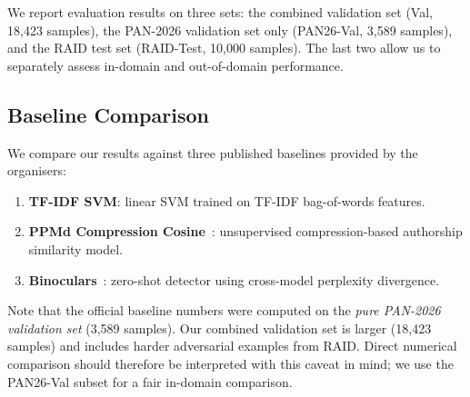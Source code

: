 We report evaluation results on three sets: the combined validation set (Val, 18,423 samples),
the PAN-2026 validation set only (PAN26-Val, 3,589 samples), and the RAID test set (RAID-Test,
10,000 samples). The last two allow us to separately assess in-domain and out-of-domain performance.

\subsection{Baseline Comparison}

We compare our results against three published baselines provided by the organisers:

\begin{enumerate}
  \item \textbf{TF-IDF SVM}: linear SVM trained on TF-IDF bag-of-words features.
  \item \textbf{PPMd Compression Cosine}~\cite{sculley:2006,halvani:2017}: unsupervised
        compression-based authorship similarity model.
  \item \textbf{Binoculars}~\cite{hans:2024}: zero-shot detector using cross-model
        perplexity divergence.
\end{enumerate}

Note that the official baseline numbers were computed on the \emph{pure PAN-2026 validation set}
(3,589 samples). Our combined validation set is larger (18,423 samples) and includes harder
adversarial examples from RAID. Direct numerical comparison should therefore be interpreted
with this caveat in mind; we use the PAN26-Val subset for a fair in-domain comparison.

